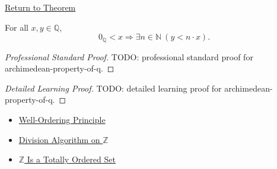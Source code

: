 \newpage
{}
\label{prf:archimedean-property-of-q}

\begin{remark*}[Return]
\hyperref[thm:archimedean-property-of-q]{Return to Theorem}
\end{remark*}

\begin{theorem*}
For all $x,y\in\mathbb{Q}$,
\[
0_{\mathbb{Q}}<x
\Longrightarrow
\exists n\in\mathbb{N}\ (y<n\cdot x).
\]
\end{theorem*}

\begin{proof}[Professional Standard Proof]
\LRAProofBodyStart
TODO: professional standard proof for archimedean-property-of-q.
\end{proof}

\begin{proof}[Detailed Learning Proof]
\LRAProofBodyStart
TODO: detailed learning proof for archimedean-property-of-q.
\end{proof}

\begin{remark*}
\end{remark*}

\begin{dependencies}
\begin{itemize}
  \item \hyperref[thm:well-ordering-principle]{Well-Ordering Principle}
  \item \hyperref[thm:division-algorithm-on-z]{Division Algorithm on $\mathbb{Z}$}
  \item \hyperref[thm:z-totally-ordered-set]{$\mathbb{Z}$ Is a Totally Ordered Set}
\end{itemize}
\end{dependencies}

\clearpage
